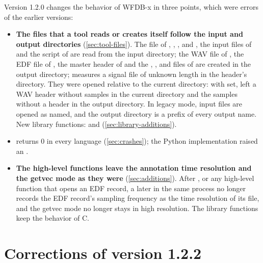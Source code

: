 Version 1.2.0 changes the behavior of WFDB-x in three points, which were
errors of the earlier versions:
\begin{itemize}
\item \textbf{The files that a tool reads or creates itself follow the input
  and output directories} (\cref{sec:tool-files}). The  file of
  , , ,  and , the
  input files of  and the  script of  are
  read from the input directory; the WAV file of , the EDF file
  of , the master header of  and the ,
  ,  and  files of  are
  created in the output directory;  measures a signal file of
  unknown length in the header's directory. They were opened relative to the
  current directory: with  set,  left a
  WAV header without samples in the current directory and the samples
  without a header in the output directory. In legacy mode, input files are
  opened as named, and the output directory is a prefix of every output
  name. New library functions:  and
   (\cref{sec:library-additions}).
\item \textbf{} returns 0 in every language
  (\cref{sec:crashes}); the Python implementation raised an
  .
\item \textbf{The high-level functions leave the annotation time resolution
  and the getvec mode as they were} (\cref{sec:additions}). After
  , or any high-level function that opens an
  EDF record, a later  in the same process no longer
  records the EDF record's sampling frequency as the time resolution of its
  file, and the getvec mode no longer stays in high resolution. The library
  functions keep the behavior of C.
\end{itemize}

\section{Corrections of version 1.2.2}
\label{sec:corrections-1-2-2}

